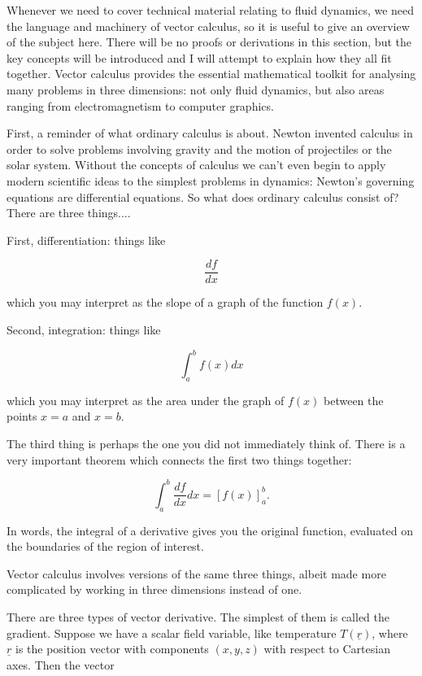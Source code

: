   Whenever we need to cover technical material relating to fluid dynamics, we 
  need the language and machinery of vector calculus, so it is useful to give 
  an overview of the subject here. There will be no proofs or derivations in 
  this section, but the key concepts will be introduced and I will attempt to 
  explain how they all fit together. Vector calculus provides the essential 
  mathematical toolkit for analysing many problems in three dimensions: not 
  only fluid dynamics, but also areas ranging from electromagnetism to computer 
  graphics. 

  First, a reminder of what ordinary calculus is about. Newton invented 
  calculus in order to solve problems involving gravity and the motion of 
  projectiles or the solar system. Without the concepts of calculus we can't 
  even begin to apply modern scientific ideas to the simplest problems in 
  dynamics: Newton's governing equations are differential equations. So what 
  does ordinary calculus consist of? There are three things.... 

  First, differentiation: things like 

  $$\dfrac{df}{dx}$$ 

  which you may interpret as the slope of a graph of the function $f(x)$. 

  Second, integration: things like 

  $$\int_a^b{f(x) dx}$$ 

  which you may interpret as the area under the graph of $f(x)$ between the 
  points $x=a$ and $x=b$. 

  The third thing is perhaps the one you did not immediately think of. There is 
  a very important theorem which connects the first two things together: 

  $$\int_a^b{\dfrac{df}{dx} dx} = [f(x)]_a^b . \tag{1}$$ 

  In words, the integral of a derivative gives you the original function, 
  evaluated on the boundaries of the region of interest. 

  Vector calculus involves versions of the same three things, albeit made more 
  complicated by working in three dimensions instead of one. 


  There are three types of vector derivative. The simplest of them is called 
  the gradient. Suppose we have a scalar field variable, like temperature 
  $T(\underline{r})$, where $\underline{r}$ is the position vector with 
  components $(x,y,z)$ with respect to Cartesian axes. Then the vector 

